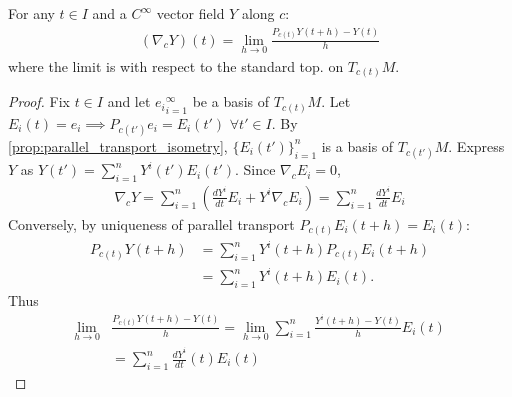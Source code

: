 \begin{proposition}
    For any $t \in I$ and a $C^{\infty}$ vector field $Y$ along $c$:
    \[\begin{aligned}
        (\nabla_c Y)(t) = \lim_{h \to 0} \frac{P_{c(t)} Y(t+h) - Y(t)}{h}
    \end{aligned}\]
    where the limit is with respect to the standard top. on $T_{c(t)}M$.
\end{proposition}
\begin{proof}
    Fix $t\in I$ and let ${e_i}_{i=1}^{\infty}$ be a basis of $T_{c(t)}M$.
    Let $E_i(t) = e_i \implies P_{c(t')}e_i = E_i(t')$ $\forall t' \in I$.
    By \autoref{prop:parallel_transport_isometry}, $\{E_i(t')\}_{i=1}^{n}$ is a basis of $T_{c(t')}M$.
    Express $Y$ as $Y(t') = \sum_{i=1}^n Y^i(t')E_i(t')$.
    Since $\nabla_c E_i = 0$,
    \[\begin{aligned}
        \nabla_c Y = \sum^n_{i=1} \left( \frac{dY^i}{dt}E_i + Y^i \nabla_c E_i\right) = \sum_{i=1}^n \frac{dY^i}{dt} E_i 
    \end{aligned}\]
    Conversely, by uniqueness of parallel transport $P_{c(t)}E_i (t+h) = E_i(t)$:
    \[\begin{aligned}
        P_{c(t)} Y(t+h) &= \sum_{i=1}^n Y^i(t+h) P_{c(t)} E_i(t+h) \\
        &= \sum_{i=1}^n Y^i(t+h) E_i(t).
    \end{aligned}\]
    Thus 
    \[\begin{aligned}
        \lim_{h \to 0} &\frac{P_{c(t)}Y(t+h)-Y(t)}{h} = \lim_{h \to 0} \sum^n_{i=1} \frac{Y^i(t+h)-Y(t)}{h} E_i (t) \\
        &= \sum_{i=1}^n \frac{dY^i}{dt}(t)E_i (t)
    \end{aligned}\]
\end{proof}

